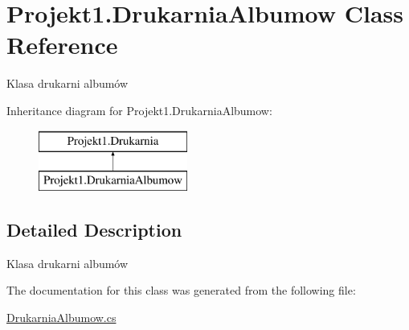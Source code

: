 \hypertarget{class_projekt1_1_1_drukarnia_albumow}{}\section{Projekt1.\+Drukarnia\+Albumow Class Reference}
\label{class_projekt1_1_1_drukarnia_albumow}


Klasa drukarni albumów  


Inheritance diagram for Projekt1.\+Drukarnia\+Albumow\+:\begin{figure}[H]
\begin{center}
\leavevmode
\includegraphics[height=2.000000cm]{class_projekt1_1_1_drukarnia_albumow}
\end{center}
\end{figure}


\subsection{Detailed Description}
Klasa drukarni albumów 



The documentation for this class was generated from the following file\+:\begin{DoxyCompactItemize}
\item 
\mbox{\hyperlink{_drukarnia_albumow_8cs}{Drukarnia\+Albumow.\+cs}}\end{DoxyCompactItemize}
